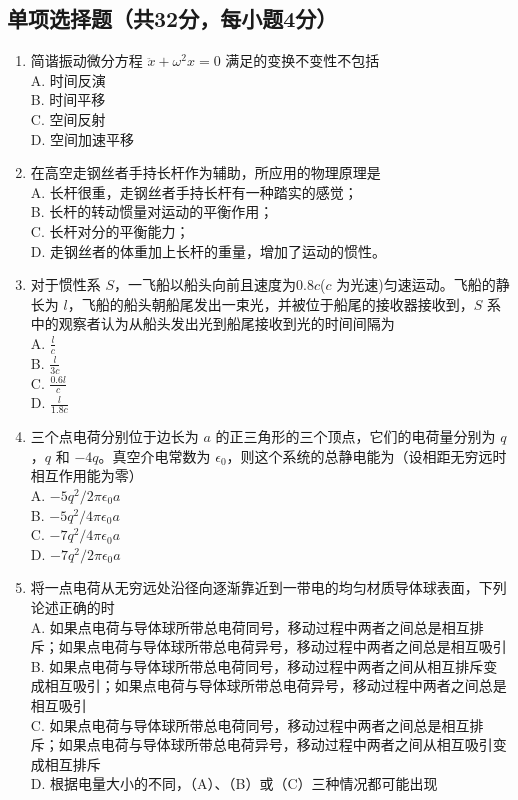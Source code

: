 


\subsection{单项选择题（共32分，每小题4分）}
\begin{enumerate}
\item 简谐振动微分方程 $\ddot{x}+{\omega}^2{x}=0$ 满足的变换不变性不包括\\
A. 时间反演\\
B. 时间平移\\
C. 空间反射\\
D. 空间加速平移\\

\item 在高空走钢丝者手持长杆作为辅助，所应用的物理原理是\\
A. 长杆很重，走钢丝者手持长杆有一种踏实的感觉；\\
B. 长杆的转动惯量对运动的平衡作用；\\
C. 长杆对分的平衡能力；\\
D. 走钢丝者的体重加上长杆的重量，增加了运动的惯性。\\

\item 对于惯性系 $S$，一飞船以船头向前且速度为0.8$c$($c$ 为光速)匀速运动。飞船的静长为 $l$，飞船的船头朝船尾发出一束光，并被位于船尾的接收器接收到，$S$ 系中的观察者认为从船头发出光到船尾接收到光的时间间隔为\\
A. $\frac{l}{c}$\\
B. $\frac{l}{3c}$\\
C. $\frac{0.6l}{c}$\\
D. $\frac{l}{1.8c}$\\

\item 三个点电荷分别位于边长为 $a$ 的正三角形的三个顶点，它们的电荷量分别为 $q$，$q$ 和 $-4q$。真空介电常数为 $\epsilon_{0}$，则这个系统的总静电能为（设相距无穷远时相互作用能为零）\\
A. $-5q^{2}/2\pi \epsilon_{0} a$\\
B. $-5q^{2}/4\pi \epsilon_{0} a$\\
C. $-7q^{2}/4\pi \epsilon_{0} a$\\
D. $-7q^{2}/2\pi \epsilon_{0} a$\\

\item 将一点电荷从无穷远处沿径向逐渐靠近到一带电的均匀材质导体球表面，下列论述正确的时\\
A. 如果点电荷与导体球所带总电荷同号，移动过程中两者之间总是相互排斥；如果点电荷与导体球所带总电荷异号，移动过程中两者之间总是相互吸引\\
B. 如果点电荷与导体球所带总电荷同号，移动过程中两者之间从相互排斥变成相互吸引；如果点电荷与导体球所带总电荷异号，移动过程中两者之间总是相互吸引\\
C. 如果点电荷与导体球所带总电荷同号，移动过程中两者之间总是相互排斥；如果点电荷与导体球所带总电荷异号，移动过程中两者之间从相互吸引变成相互排斥\\
D. 根据电量大小的不同，（A）、（B）或（C）三种情况都可能出现\\


\end{enumerate}
